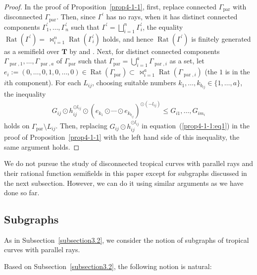 \documentclass[a4paper,12pt]{amsart}
\def\Gamma{\varGamma}
\begin{document}
\begin{proof}
In the proof of Proposition~\ref{prop4-1-1}, first, replace connected $\Gamma_{\operatorname{par}}$ with disconnected $\Gamma_{\operatorname{par}}$.
Then, since $\Gamma^{\prime}$ has no rays, when it has distinct connected components $\Gamma^{\prime}_1, \ldots, \Gamma^{\prime}_n$ such that $\Gamma^{\prime} = \bigsqcup_{i = 1}^n \Gamma^{\prime}_i$, the equality $\operatorname{Rat}(\Gamma^{\prime}) = \, \bowtie_{i = 1}^n \operatorname{Rat}(\Gamma^{\prime}_i)$ holds, and hence $\operatorname{Rat}(\Gamma^{\prime})$ is finitely generated as a semifield over $\boldsymbol{T}$ by \cite[Proposition~3.6]{JuAe3} and \cite[Lemma~3.34]{JuAe=Nakajima}.
Next, for distinct connected components $\Gamma_{\operatorname{par}, 1}, \ldots, \Gamma_{\operatorname{par}, a}$ of $\Gamma_{\operatorname{par}}$ such that $\Gamma_{\operatorname{par}} = \bigcup_{i = 1}^a \Gamma_{\operatorname{par}, i}$ as a set, let $e_i := (0, \ldots, 0, 1, 0, \ldots, 0) \in \operatorname{Rat}(\Gamma_{\operatorname{par}}) \subset \, \bowtie_{i = 1}^a \operatorname{Rat}(\Gamma_{\operatorname{par}, i})$ (the $1$ is in the $i$th component).
For each $L_{ij}$, choosing suitable numbers $k_1, \ldots, k_{b_{ij}} \in \{ 1, \ldots, a \}$, the inequality
\begin{align*}
    G_{ij} \odot h_{ij}^{\odot l_{ij}} \odot (e_{k_1} \odot \cdots \odot e_{k_{b_{ij}}})^{\odot (- l_{ij})} \le G_{i1}, \ldots, G_{im_i}
\end{align*}
holds on $\Gamma_{\operatorname{par}} \setminus L_{ij}$.
Then, replacing $G_{ij} \odot h_{ij}^{\odot l_{ij}}$ in equation~(\ref{prop4-1-1:eq1}) in the proof of Proposition~\ref{prop4-1-1} with the left hand side of this inequality, the same argument holds.
\end{proof}

We do not pursue the study of disconnected tropical curves with parallel rays and their rational function semifields in this paper except for subgraphs discussed in the next subsection.
However, we can do it using similar arguments as we have done so far.

\subsection{Subgraphs}
    \label{subsection4.4}

As in Subsection~\ref{subsection3.2}, we consider the notion of subgraphs of tropical curves with parallel rays.

Based on Subsection~\ref{subsection3.2}, the following notion is natural:
\end{document}
